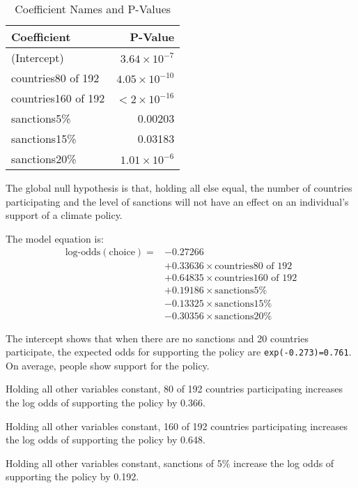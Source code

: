 \documentclass[12pt,letterpaper]{article}
\begin{document}
\begin{enumerate}
	\begin{table}[htbp]
		\centering
		\caption{Coefficient Names and P-Values}
		\begin{tabular}{l r}
			\toprule
			\textbf{Coefficient} & \textbf{P-Value} \\
			\midrule
			(Intercept) & $3.64 \times 10^{-7}$ \\
			countries80 of 192 & $4.05 \times 10^{-10}$ \\
			countries160 of 192 & $< 2 \times 10^{-16}$ \\
			sanctions5\% & 0.00203 \\
			sanctions15\% & 0.03183 \\
			sanctions20\% & $1.01 \times 10^{-6}$ \\
			\bottomrule
		\end{tabular}
	\end{table} 
	
	The global null hypothesis is that, holding all else equal, the number of countries participating and the level of sanctions will not have an effect on an individual's support of a climate policy. 
	
	The model equation is:  
	\begin{equation}
		\begin{split}
			\text{log-odds}(\text{choice}) = & -0.27266 \\
			& + 0.33636 \times \text{countries80 of 192} \\
			& + 0.64835 \times \text{countries160 of 192} \\
			& + 0.19186 \times \text{sanctions5\%} \\
			& - 0.13325 \times \text{sanctions15\%} \\
			& - 0.30356 \times \text{sanctions20\%}
		\end{split}
	\end{equation}
	
	The intercept shows that when there are no sanctions and 20 countries participate, the expected odds for supporting the policy are \texttt{exp(-0.273)=0.761}. On average, people show support for the policy.
	
	Holding all other variables constant, 80 of 192 countries participating increases the log odds of supporting the policy by 0.366.
	
	Holding all other variables constant, 160 of 192 countries participating increases the log odds of supporting the policy by 0.648.
	
	Holding all other variables constant, sanctions of 5\% increase the log odds of supporting the policy by 0.192.
	

\end{enumerate}
\end{document}
